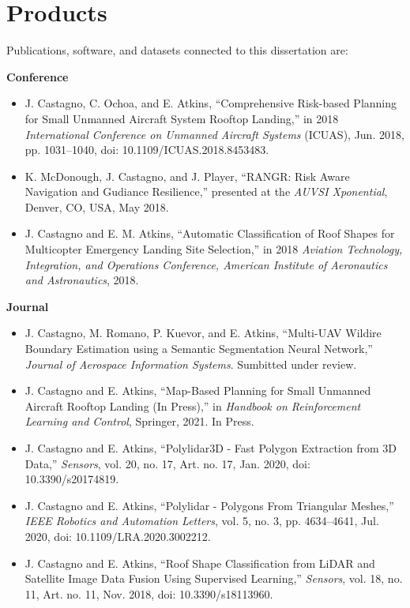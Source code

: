 \section{Products}

Publications, software, and datasets connected to this dissertation are:
\vspace{0.2cm}

\textbf{Conference}
\vspace{0.20cm}
\begin{itemize}[noitemsep]
    \item J. Castagno, C. Ochoa, and E. Atkins, ``Comprehensive Risk-based Planning for Small Unmanned Aircraft System Rooftop Landing,” in 2018 \emph{International Conference on Unmanned Aircraft Systems} (ICUAS), Jun. 2018, pp. 1031–1040, doi: 10.1109/ICUAS.2018.8453483.
    \item K. McDonough, J. Castagno, and J. Player, ``RANGR: Risk Aware Navigation and Gudiance Resilience,” presented at the \emph{AUVSI Xponential}, Denver, CO, USA, May 2018.
	\item J. Castagno and E. M. Atkins, ``Automatic Classification of Roof Shapes for Multicopter Emergency Landing Site Selection,” in 2018 \emph{Aviation Technology, Integration, and Operations Conference, American Institute of Aeronautics and Astronautics}, 2018.
\end{itemize}

\vspace{0.25cm}

\textbf{Journal}

\vspace{0.20cm}
\begin{itemize}[noitemsep]
    \item J. Castagno, M. Romano, P. Kuevor, and E. Atkins, ``Multi-UAV Wildire Boundary Estimation using a Semantic Segmentation Neural Network,” \emph{Journal of Aerospace Information Systems}. Sumbitted under review.
    \item J. Castagno and E. Atkins, ``Map-Based Planning for Small Unmanned Aircraft Rooftop Landing (In Press),” in \emph{Handbook on Reinforcement Learning and Control}, Springer, 2021. In Press.
    \item J. Castagno and E. Atkins, “Polylidar3D - Fast Polygon Extraction from 3D Data,” \emph{Sensors}, vol. 20, no. 17, Art. no. 17, Jan. 2020, doi: 10.3390/s20174819.
    \item J. Castagno and E. Atkins, “Polylidar - Polygons From Triangular Meshes,” \emph{IEEE Robotics and Automation Letters}, vol. 5, no. 3, pp. 4634–4641, Jul. 2020, doi: 10.1109/LRA.2020.3002212.
    \item J. Castagno and E. Atkins, “Roof Shape Classification from LiDAR and Satellite Image Data Fusion Using Supervised Learning,” \emph{Sensors}, vol. 18, no. 11, Art. no. 11, Nov. 2018, doi: 10.3390/s18113960.
\end{itemize}

